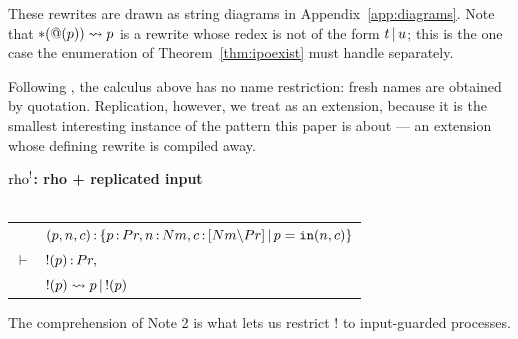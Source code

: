 \documentclass{article}
\begin{document}
These rewrites are drawn as string diagrams in Appendix~\ref{app:diagrams}. Note that $\ast(@(p))\rightsquigarrow p$ is a rewrite whose redex is not of the form $t\,|\, u$; this is the one case the enumeration of Theorem~\ref{thm:ipoexist} must handle separately.

Following \citet{rho}, the calculus above has no name restriction: fresh names are obtained by quotation. Replication, however, we treat as an extension, because it is the smallest interesting instance of the pattern this paper is about --- an extension whose defining rewrite is compiled away.

\begin{mdframed}
\begin{center}
    \textbf{$\mathrm{rho}^{!}$: rho + replicated input}\\~\\
    \begin{tabular}{cl}
         & $(p,n,c)\,{:}\, \{p\,{:}\, Pr, n\,{:}\, Nm, c\,{:}\, [Nm{\setminus} Pr]\,|\, p=\mathtt{in}(n,c)\}$\\
         $\vdash$ & $!(p)\,{:}\, Pr,$\\
         & $!(p)\rightsquigarrow p\,|\, !(p)$
    \end{tabular}
\end{center}
\end{mdframed}

The comprehension of Note 2 is what lets us restrict $!$ to input-guarded processes.
\end{document}
